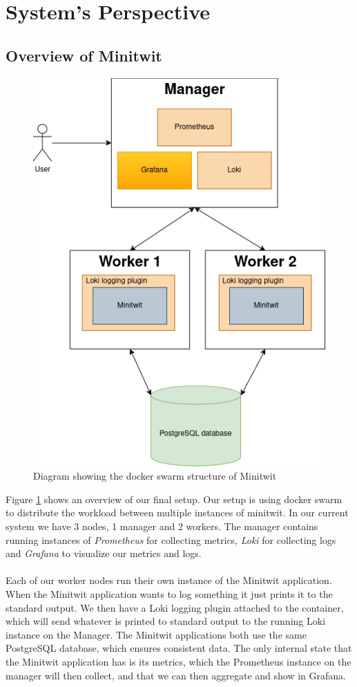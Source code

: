 \section{System's Perspective}
\subsection{Overview of Minitwit}
\begin{figure}[H]
    \centering
    \includegraphics[scale=.7]{diagrams/overall_system.png}
    \caption{Diagram showing the docker swarm structure of Minitwit}
    \label{fig:overall_system}
\end{figure}
Figure \ref{fig:overall_system} shows an overview of our final setup. Our setup is using docker swarm to distribute the workload between multiple instances of minitwit. In our current system we have 3 nodes, 1 manager and 2 workers. The manager contains running instances of \textit{Prometheus} for collecting metrics, \textit{Loki} for collecting logs and \textit{Grafana} to visualize our metrics and logs.
\\
\\
Each of our worker nodes run their own instance of the Minitwit application. When the Minitwit application wants to log something it just prints it to the standard output. We then have a Loki logging plugin attached to the container, which will send whatever is printed to standard output to the running Loki instance on the Manager. The Minitwit applications both use the same PostgreSQL database, which ensures consistent data. The only internal state that the Minitwit application has is its metrics, which the Prometheus instance on the manager will then collect, and that we can then aggregate and show in Grafana. 

